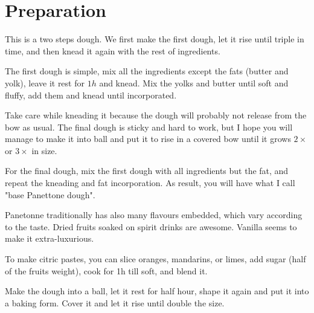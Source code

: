 \section{Preparation}

This is a two steps dough. We first make the first dough, let it rise until triple in time, and then knead it again with the rest of ingredients.

The first dough is simple, mix all the ingredients except the fats (butter and yolk), leave it rest for $1h$ and knead. 
%
Mix the yolks and butter until soft and fluffy, add them and knead until incorporated.

Take care while kneading it because the dough will probably not release from the bow as usual.
%
The final dough is sticky and hard to work, but I hope you will manage to make it into ball and put it to rise in a covered bow until it grows $2\times$ or $3\times$ in size.

For the final dough, mix the first dough with all ingredients but the fat, and repeat the kneading and fat incorporation.
%
As result, you will have what I call "base Panettone dough".





Panetonne traditionally has also many flavours embedded, which vary according to the taste.
%
Dried fruits soaked on spirit drinks are awesome. Vanilla seems to make it extra-luxurious.

To make citric pastes, you can slice oranges, mandarins, or limes, add sugar (half of the fruits weight), cook for 1h till soft, and blend it.

Make the dough into a ball, let it rest for half hour, shape it again and put it into a baking form. Cover it and let it rise until double the size.

